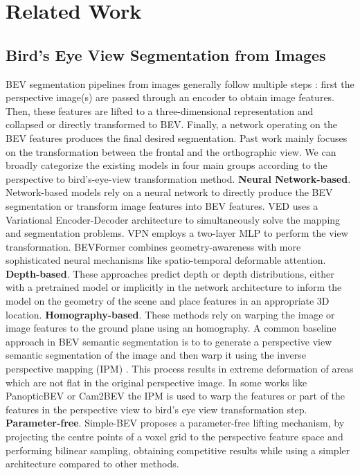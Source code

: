 \section{Related Work}
\label{sec:related work}
\subsection{Bird's Eye View Segmentation from Images}

BEV segmentation pipelines from images generally follow multiple steps \cite{li_delving_2024}: first the perspective image(s) are passed through an encoder to obtain image features. Then, these features are lifted to a three-dimensional representation and collapsed or directly transformed to BEV. Finally, a network operating on the BEV features produces the final desired segmentation. Past work mainly focuses on the transformation between the frontal and the orthographic view. 
We can broadly categorize the existing models in four main groups according to the perspective to bird's-eye-view transformation method. 
\textbf{Neural Network-based}. Network-based models rely on a neural network to directly produce the BEV segmentation or transform image features into BEV features. VED \cite{lu_monocular_2019} uses a Variational Encoder-Decoder architecture to simultaneously solve the mapping and segmentation problems. VPN \cite{pan_cross-view_2020} employs a two-layer MLP to perform the view transformation. BEVFormer \cite{li_bevformer_2022} combines geometry-awareness with more sophisticated neural mechanisms like spatio-temporal deformable attention.
\textbf{Depth-based}. These approaches predict depth or depth distributions, either with a pretrained model \cite{reading_categorical_2021} or implicitly in the network architecture \cite{philion_lift_2020} to inform the model on the geometry of the scene and place features in an appropriate 3D location. 
\textbf{Homography-based}. These methods rely on warping the image or image features to the ground plane using an homography. A common baseline approach in BEV semantic segmentation is to to generate a perspective view semantic segmentation of the image and then warp it using the inverse perspective mapping (IPM) \cite{mallot_inverse_1991}. This process results in extreme deformation of areas which are not flat in the original perspective image. In some works like PanopticBEV \cite{gosala_birds-eye-view_2022} or Cam2BEV \cite{reiher_sim2real_2020} the IPM is used to warp the features or part of the features in the perspective view to bird's eye view transformation step.
\textbf{Parameter-free}. Simple-BEV \cite{harley_simple-bev_2023} proposes a parameter-free lifting mechanism, by projecting the centre points of a voxel grid to the perspective feature space and performing bilinear sampling, obtaining competitive results while using a simpler architecture compared to other methods.

